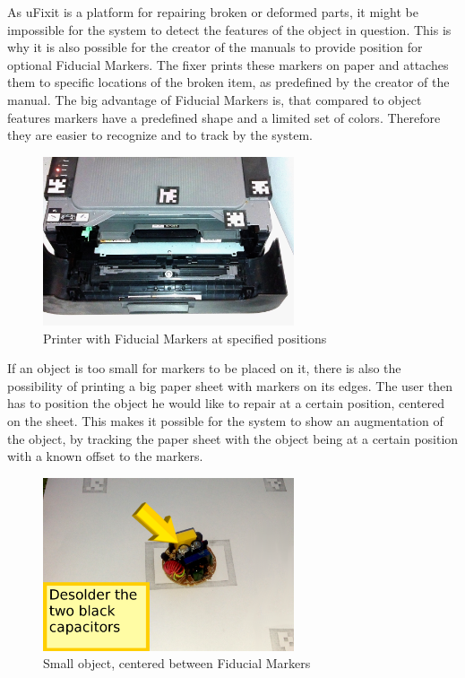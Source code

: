 As uFixit is a platform for repairing broken or deformed parts, it might be impossible for the system to detect the features of the object in question. This is why it is also possible for the creator of the manuals to provide position for optional Fiducial Markers. The fixer prints these markers on paper and attaches them to specific locations of the broken item, as predefined by the creator of the manual. The big advantage of Fiducial Markers is, that compared to object features markers have a predefined shape and a limited set of colors. Therefore they are easier to recognize and to track by the system.
\begin{figure}[H]
		\includegraphics[width=0.66\textwidth]{../images/markerOnObject.jpg}
		\centering
		\caption{Printer with Fiducial Markers at specified positions}
		\label{fig:cardBoard}
\end{figure}

If an object is too small for markers to be placed on it, there is also the possibility of printing a big paper sheet with markers on its edges. The user then has to position the object he would like to repair at a certain position, centered on the sheet. This makes it possible for the system to show an augmentation of the object, by tracking the paper sheet with the object being at a certain position with a known offset to the markers.
\begin{figure}[H]
		\includegraphics[width=0.66\textwidth]{../images/markerOnPaper.png}
		\centering
		\caption{Small object, centered between Fiducial Markers}
		\label{fig:cardBoard}
\end{figure}

